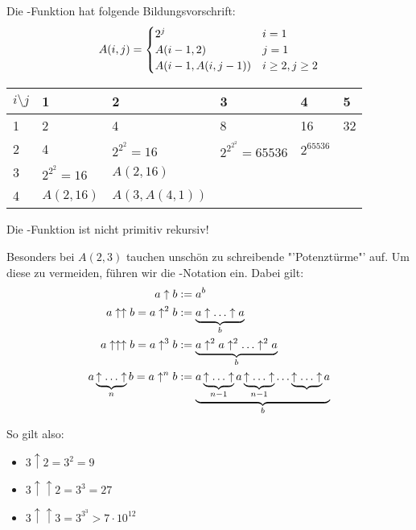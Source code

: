 Die -Funktion hat folgende Bildungsvorschrift:
\begin{align}
	A(i,j)=\begin{cases}
	2^j & i=1 \\
	A(i-1,2) & j=1 \\
	A(i-1,A(i,j-1)) & i\ge 2, j\ge 2
	\end{cases}\notag
\end{align}

\begin{center}
	\begin{tabular}{p{1cm}|p{2cm}p{2cm}p{2cm}p{2cm}p{2cm}}
		\rowcolor{lightgray} $i\setminus j$ & 1 & 2 & 3 & 4 & 5 \\
		\hline
		\cellcolor{lightgray} 1 & 2 & 4 & 8 & 16 & 32 \\
		\cellcolor{lightgray} 2 & 4 & $2^{2^2}=16$ & $2^{2^{2^2}}=65536$ & $2^{65536}$ & \\
		\cellcolor{lightgray} 3 & $2^{2^2}=16$ & $A(2,16)$ & & & \\
		\cellcolor{lightgray} 4 & $A(2,16)$ & $A(3,A(4,1))$ & & &
	\end{tabular}
\end{center}

Die -Funktion ist nicht primitiv rekursiv!

Besonders bei $A(2,3)$ tauchen unschön zu schreibende "'Potenztürme"' auf. Um diese zu vermeiden, führen wir die -Notation ein. Dabei gilt:
\begin{align}
	a\uparrow b &:= a^b \notag \\
	a\uparrow\uparrow b = a\uparrow^2 b &:= \underbrace{a\uparrow\dots\uparrow a}_b \notag \\
	a\uparrow\uparrow\uparrow b = a\uparrow^3 b &:= \underbrace{a\uparrow^2 a\uparrow^2\dots\uparrow^2 a}_b \notag \\
	a\underbrace{\uparrow\dots\uparrow}_n b = a\uparrow^n b &:= \underbrace{a\underbrace{\uparrow\dots\uparrow}_{n-1} a\underbrace{\uparrow\dots\uparrow}_{n-1}\dots\underbrace{\uparrow\dots\uparrow}a}_b\notag
\end{align}

So gilt also:
\begin{itemize}
	\item $3\uparrow 2=3^2=9$
	\item $3\uparrow\uparrow 2 = 3^3 = 27$
	\item $3\uparrow\uparrow 3 = 3^{3^3} > 7\cdot 10^{12}$
\end{itemize}